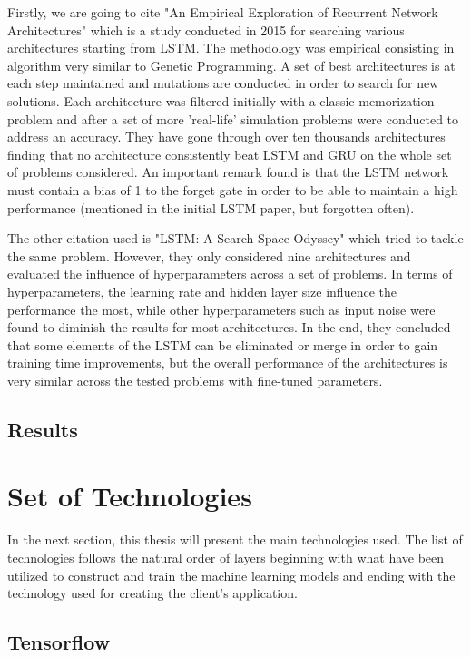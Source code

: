 Firstly, we are going to cite "An Empirical Exploration of Recurrent Network Architectures" \cite{jozefowicz2015empirical} which is a study conducted in 2015 for searching various architectures starting from LSTM. The methodology was empirical consisting in algorithm very similar to Genetic Programming. A set of best architectures is at each step maintained and mutations are conducted in order to search for new solutions. Each architecture was filtered initially with a classic memorization problem and after a set of more 'real-life' simulation problems were conducted to address an accuracy. They have gone through over ten thousands architectures finding that no architecture consistently beat LSTM and GRU on the whole set of problems considered. An important remark found is that the LSTM network must contain a bias of 1 to the forget gate in order to be able to maintain a high performance (mentioned in the initial LSTM paper, but forgotten often).

The other citation used is "LSTM: A Search Space Odyssey" \cite{greff2016lstm} which tried to tackle the same problem. However, they only considered nine architectures and evaluated the influence of hyperparameters across a set of problems. In terms of hyperparameters, the learning rate and hidden layer size influence the performance the most, while other hyperparameters such as input noise were found to diminish the results for most architectures. In the end, they concluded that some elements of the LSTM can be eliminated or merge in order to gain training time improvements, but the overall performance of the architectures is very similar across the tested problems with fine-tuned parameters.


\subsection{Results}


\newpage

\section{Set of Technologies}

In the next section, this thesis will present the main technologies used. The list of technologies follows the natural order of layers beginning with what have been utilized to construct and train the machine learning models and ending with the technology used for creating the client's application.

\subsection{Tensorflow}


